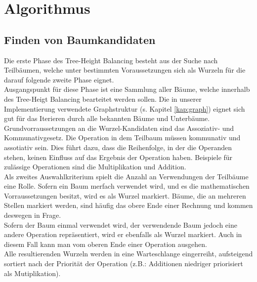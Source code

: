\chapter{Algorithmus}



\section{Finden von Baumkandidaten}
Die erste Phase des Tree-Height Balancing besteht aus der Suche nach Teilbäumen, welche unter bestimmten Voraussetzungen sich als Wurzeln für die darauf folgende zweite Phase eignet.\\
Ausgangspunkt für diese Phase ist eine Sammlung aller Bäume, welche innerhalb des Tree-Heigt Balancing bearteitet werden sollen. Die in unserer Implementierung verwendete Graphstruktur (s. Kapitel \ref{kap:graph}) eignet sich gut für das Iterieren durch alle bekannten Bäume und Unterbäume.\\
Grundvorraussetzungen an die Wurzel-Kandidaten sind das Assoziativ- und Kommunativgesetz. Die Operation in dem Teilbaum müssen kommunativ und assotiativ sein. Dies führt dazu, dass die Reihenfolge, in der die Operanden stehen, keinen Einfluss auf das Ergebnis der Operation haben. Beispiele für zulässige Operationen sind die Multiplikation und Addition.\\
Als zweites Auswahlkriterium spielt die Anzahl an Verwendungen der Teilbäume eine Rolle. Sofern ein Baum merfach verwendet wird, und es die mathematischen Vorraussetzungen besitzt, wird es als Wurzel markiert. Bäume, die an mehreren Stellen markiert werden, sind häufig das obere Ende einer Rechnung und kommen deswegen in Frage.\\
Sofern der Baum einmal verwendet wird, der verwendende Baum jedoch eine andere Operation repräsentiert, wird er ebenfalls als Wurzel markiert. Auch in diesem Fall kann man vom oberen Ende einer Operation ausgehen.\\
Alle resultierenden Wurzeln werden in eine Warteschlange eingerreiht, aufsteigend sortiert nach der Priorität der Operation (z.B.: Additionen niedriger priorisiert als Mutiplikation).\\

